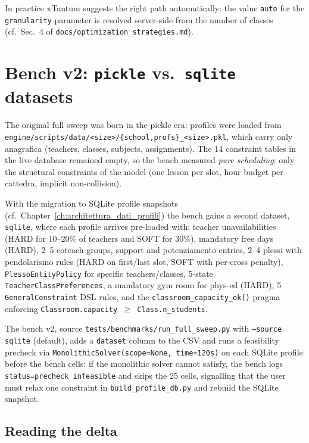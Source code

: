 In practice $\pi$Tantum suggests the right path automatically:
the value \texttt{auto} for the \texttt{granularity} parameter is
resolved server-side from the number of classes (cf.\ Sec.~4 of
\texttt{docs/optimization\_strategies.md}).

\section{Bench v2: \texttt{pickle} vs.\ \texttt{sqlite} datasets}
\label{sec:bench-v2-en}

The original full sweep was born in the pickle era: profiles
were loaded from
\texttt{engine/scripts/data/<size>/\{school,profs\}\_<size>.pkl},
which carry only anagrafica (teachers, classes, subjects,
assignments). The 14 constraint tables in the live database
remained empty, so the bench measured \emph{pure scheduling}: only
the structural constraints of the model (one lesson per slot,
hour budget per cattedra, implicit non-collision).

With the migration to SQLite profile snapshots
(cf.\ Chapter~\ref{ch:architettura_dati_profili}) the bench
gains a second dataset, \texttt{sqlite}, where each profile
arrives pre-loaded with: teacher unavailabilities (HARD for
10--20\% of teachers and SOFT for 30\%), mandatory free days
(HARD), 2--5 coteach groups, support and potenziamento entries,
2--4 plessi with pendolarismo rules (HARD on first/last slot,
SOFT with per-cross penalty), \texttt{PlessoEntityPolicy} for
specific teachers/classes, 5-state
\texttt{TeacherClassPreferences}, a mandatory gym room for
phys-ed (HARD), 5 \texttt{GeneralConstraint} DSL rules, and the
\texttt{classroom\_capacity\_ok()} pragma enforcing
\texttt{Classroom.capacity $\ge$ Class.n\_students}.

The bench v2, source
\texttt{tests/benchmarks/run\_full\_sweep.py} with
\texttt{--source sqlite} (default), adds a \texttt{dataset}
column to the CSV and runs a feasibility precheck via
\texttt{MonolithicSolver(scope=None, time=120s)} on each SQLite
profile before the bench cells: if the monolithic solver cannot
satisfy, the bench logs \texttt{status=precheck infeasible} and
skips the 25 cells, signalling that the user must relax one
constraint in \texttt{build\_profile\_db.py} and rebuild the
SQLite snapshot.

\subsection{Reading the delta}

